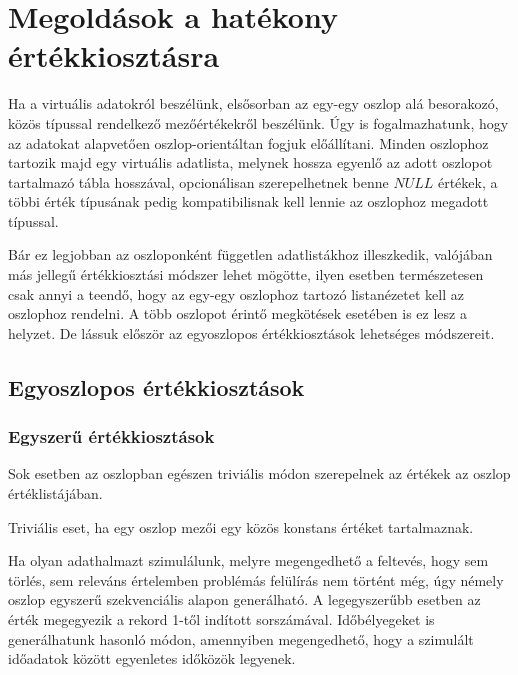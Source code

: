 \documentclass[
    parspace, %
    noindent, %
]{elteiktdk}[2023/10/30]
\begin{document}

\section{Megoldások a hatékony értékkiosztásra}

Ha a virtuális adatokról beszélünk, elsősorban az egy-egy oszlop alá besorakozó,
közös típussal rendelkező mezőértékekről beszélünk.
Úgy is fogalmazhatunk, hogy az adatokat alapvetően oszlop-orientáltan fogjuk előállítani.
Minden oszlophoz tartozik majd egy virtuális adatlista,
melynek hossza egyenlő az adott oszlopot tartalmazó tábla hosszával,
opcionálisan szerepelhetnek benne $NULL$ értékek,
a többi érték típusának pedig kompatibilisnak kell lennie az oszlophoz megadott típussal.

Bár ez legjobban az oszloponként független adatlistákhoz illeszkedik,
valójában más jellegű értékkiosztási módszer lehet mögötte,
ilyen esetben természetesen csak annyi a teendő,
hogy az egy-egy oszlophoz tartozó listanézetet kell az oszlophoz rendelni.
A több oszlopot érintő megkötések esetében is ez lesz a helyzet.
De lássuk először az egyoszlopos értékkiosztások lehetséges módszereit.

\subsection{Egyoszlopos értékkiosztások}


\subsubsection{Egyszerű értékkiosztások}

Sok esetben az oszlopban egészen triviális módon szerepelnek az értékek az oszlop értéklistájában.

Triviális eset, ha egy oszlop mezői egy közös konstans értéket tartalmaznak.

Ha olyan adathalmazt szimulálunk, melyre megengedhető a feltevés,
hogy sem törlés, sem releváns értelemben problémás felülírás nem történt még,
úgy némely oszlop egyszerű szekvenciális alapon generálható.
A legegyszerűbb esetben az érték megegyezik a rekord 1-től indított sorszámával.
Időbélyegeket is generálhatunk hasonló módon,
amennyiben megengedhető, hogy a szimulált időadatok között egyenletes időközök legyenek.
\end{document}
